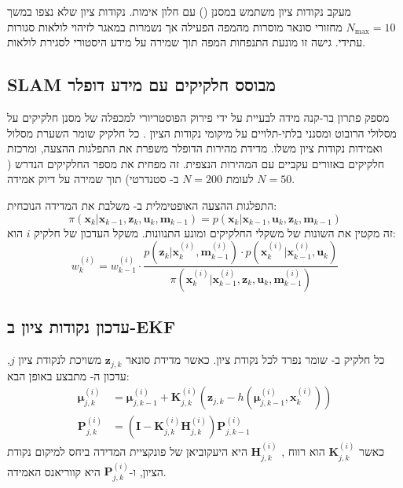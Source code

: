מעקב נקודות ציון משתמש במסנן  () עם חלון אימות. נקודות ציון שלא נצפו במשך $N_{\text{max}} = 10$ מחזורי סונאר מוסרות מהמפה הפעילה אך נשמרות במאגר לזיהוי לולאות סגורות עתידי. גישה זו מונעת התנפחות המפה תוך שמירה על מידע היסטורי לסגירת לולאות.

\subsection{SLAM מבוסס חלקיקים עם מידע דופלר}
\label{sec:ch04_particle_filter_slam}

 מספק פתרון בר-קנה מידה לבעיית  על ידי פירוק הפוסטריורי למכפלה של מסנן חלקיקים על מסלולי הרובוט ומסנני  בלתי-תלויים על מיקומי נקודות הציון \cite{Montemerlo2002FastSLAM}. כל חלקיק שומר השערת מסלול ואמידות נקודות ציון משלו. מדידת מהירות הדופלר משפרת את התפלגות ההצעה, ומרכזת חלקיקים באזורים עקביים עם המהירות הנצפית. זה מפחית את מספר החלקיקים הנדרש ($N=50$ לעומת $N=200$ ב- סטנדרטי) תוך שמירה על דיוק אמידה.

התפלגות ההצעה האופטימלית ב- משלבת את המדידה הנוכחית:
\begin{equation}
\pi(\mathbf{x}_k | \mathbf{x}_{k-1}, \mathbf{z}_k, \mathbf{u}_k, \mathbf{m}_{k-1}) = p(\mathbf{x}_k | \mathbf{x}_{k-1}, \mathbf{u}_k, \mathbf{z}_k, \mathbf{m}_{k-1})
\label{eq:ch04_proposal}
\end{equation}
זה מקטין את השונות של משקלי החלקיקים ומונע התנוונות. משקל העדכון של חלקיק $i$ הוא:
\begin{equation}
w_k^{(i)} = w_{k-1}^{(i)} \cdot \frac{p(\mathbf{z}_k | \mathbf{x}_k^{(i)}, \mathbf{m}_{k-1}^{(i)}) \cdot p(\mathbf{x}_k^{(i)} | \mathbf{x}_{k-1}^{(i)}, \mathbf{u}_k)}{\pi(\mathbf{x}_k^{(i)} | \mathbf{x}_{k-1}^{(i)}, \mathbf{z}_k, \mathbf{u}_k, \mathbf{m}_{k-1}^{(i)})}
\label{eq:ch04_weight_update}
\end{equation}

\subsection{עדכון נקודות ציון ב-EKF}
\label{sec:ch04_landmark_ekf}

כל חלקיק ב- שומר  נפרד לכל נקודת ציון. כאשר מדידת סונאר $\mathbf{z}_{j,k}$ משויכת לנקודת ציון $j$, עדכון ה- מתבצע באופן הבא:
\begin{align}
\boldsymbol{\mu}_{j,k}^{(i)} &= \boldsymbol{\mu}_{j,k-1}^{(i)} + \mathbf{K}_{j,k}^{(i)} \left( \mathbf{z}_{j,k} - h(\boldsymbol{\mu}_{j,k-1}^{(i)}, \mathbf{x}_k^{(i)}) \right) \\
\mathbf{P}_{j,k}^{(i)} &= \left( \mathbf{I} - \mathbf{K}_{j,k}^{(i)} \mathbf{H}_{j,k}^{(i)} \right) \mathbf{P}_{j,k-1}^{(i)}
\label{eq:ch04_landmark_update}
\end{align}
כאשר $\mathbf{K}_{j,k}^{(i)}$ הוא רווח , $\mathbf{H}_{j,k}^{(i)}$ היא היעקוביאן של פונקציית המדידה ביחס למיקום נקודת הציון, ו-$\mathbf{P}_{j,k}^{(i)}$ היא קווריאנס האמידה.

